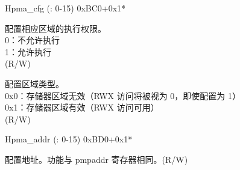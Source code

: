 \addtocounter{Regfloat}{-1}
\begin{register}{H}{pma\_cfg (: 0-15)} {0xBC0+0x1*}
\begin{regdesc}\begin{reglist}
 \item [接上页……]
\label{fielddesc:EXECUTE}\item [EXECUTE] 配置相应区域的执行权限。\\
0：不允许执行\\
1：允许执行\\
 (R/W)
\label{fielddesc:TYPE}\item [TYPE] 配置区域类型。\\
0x0：存储器区域无效（RWX 访问将被视为 0，即使配置为 1）\\
0x1：存储器区域有效（RWX 访问可用）\\
(R/W)
\end{reglist}
\end{regdesc}
\end{register}

\begin{register}{H}{pma\_addr (: 0-15)} {0xBD0+0x1*}
\label{regdesc:pma_addrX}
%
\regnewline%
\begin{regdesc}
\begin{reglist}
\label{fielddesc:PMAADDR}\item [ADDR] 配置地址。功能与 pmpaddr 寄存器相同。(R/W)
\end{reglist}
\end{regdesc}
\end{register}

